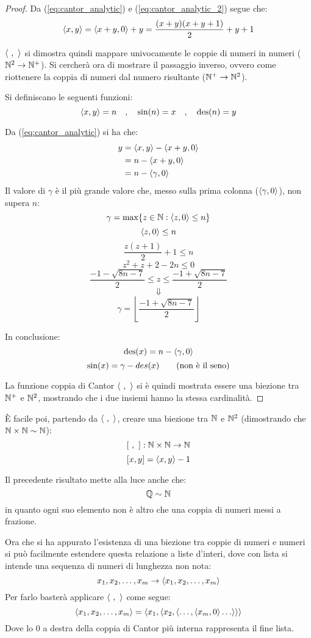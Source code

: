\begin{proof}
    Da (\ref{eq:cantor_analytic}) e (\ref{eq:cantor_analytic_2}) segue che:
    $$ \langle x,y\rangle = \langle x+y,0\rangle+y = \frac{(x+y)(x+y+1)}{2}+y+1 $$
    
    $\cantor{\ ,\ }$ si dimostra quindi mappare univocamente le coppie di numeri
    in numeri ($\mathbb{N}^2\rightarrow\mathbb{N}^+$). Si cercherà ora di mostrare il passaggio inverso, 
    ovvero come riottenere la coppia di numeri dal numero risultante
    ($\mathbb{N}^+\rightarrow\mathbb{N}^2$).

    Si definiscano le seguenti funzioni:
    $$ \langle x,y\rangle = n \quad , \quad \text{sin}(n) = x \quad , \quad \text{des}(n) = y $$

    Da (\ref{eq:cantor_analytic}) si ha che:
    $$ \begin{aligned}
        y &= \langle x,y\rangle-\langle x+y,0\rangle \\
          &= n-\langle x+y,0\rangle \\
          &= n-\langle\gamma,0\rangle \\
    \end{aligned} $$
    Il valore di $\gamma$ è il più grande valore che, messo sulla prima colonna
    ($\langle\gamma,0\rangle$), non supera $n$:
    $$ \gamma = \max\{z\in\mathbb{N}:\langle z,0\rangle\leq n\} $$
    $$ \langle z,0\rangle\leq n $$
    $$ \frac{z(z+1)}{2}+1 \leq n $$
    $$ z^2+z+2-2n\leq 0 $$
    $$ \frac{-1-\sqrt{8n-7}}{2}\leq z \leq \frac{-1+\sqrt{8n-7}}{2} $$
    $$ \Downarrow $$
    $$ \gamma=\left\lfloor\frac{-1+\sqrt{8n-7}}{2}\right\rfloor $$
    
    In conclusione:
    $$ \text{des}(x) = n-\langle\gamma,0\rangle $$
    \begin{equation} \text{sin}(x) = \gamma-des(x) \tag{non è il seno} \end{equation}

    La funzione coppia di Cantor $\cantor{\ ,\ }$ si è quindi mostrata
    essere una biezione tra $\mathbb{N}^+$ e $\mathbb{N}^2$, mostrando che i due insiemi
    hanno la stessa cardinalità.
\end{proof}

È facile poi, partendo da $\cantor{\ ,\ }$, creare una biezione tra $\mathbb{N}$ e $\mathbb{N}^2$
(dimostrando che $\mathbb{N}\times\mathbb{N}\sim\mathbb{N}$):
$$ [\ ,\ ]:\mathbb{N}\times\mathbb{N}\rightarrow\mathbb{N} $$
$$ [x,y] = \langle x,y\rangle-1 $$

Il precedente risultato mette alla luce anche che:
$$ \mathbb{Q}\sim\mathbb{N} $$
in quanto ogni suo elemento non è altro che una coppia di numeri messi
a frazione.

Ora che si ha appurato l'esistenza di una biezione tra coppie di numeri e numeri si può
facilmente estendere questa relazione a liste d'interi, dove con lista si intende una
sequenza di numeri di lunghezza non nota:
$$ x_1,x_2,\dots,x_m \rightarrow \langle x_1,x_2,\dots,x_m\rangle $$
Per farlo basterà applicare $\cantor{\ ,\ }$ come segue:
$$ \cantor{x_1,x_2,\dots,x_m} = 
\cantor{x_1,\cantor{x_2,\cantor{\dots,\cantor{x_m,0}\dots}}} $$
Dove lo 0 a destra della coppia di Cantor più interna rappresenta il fine lista.

